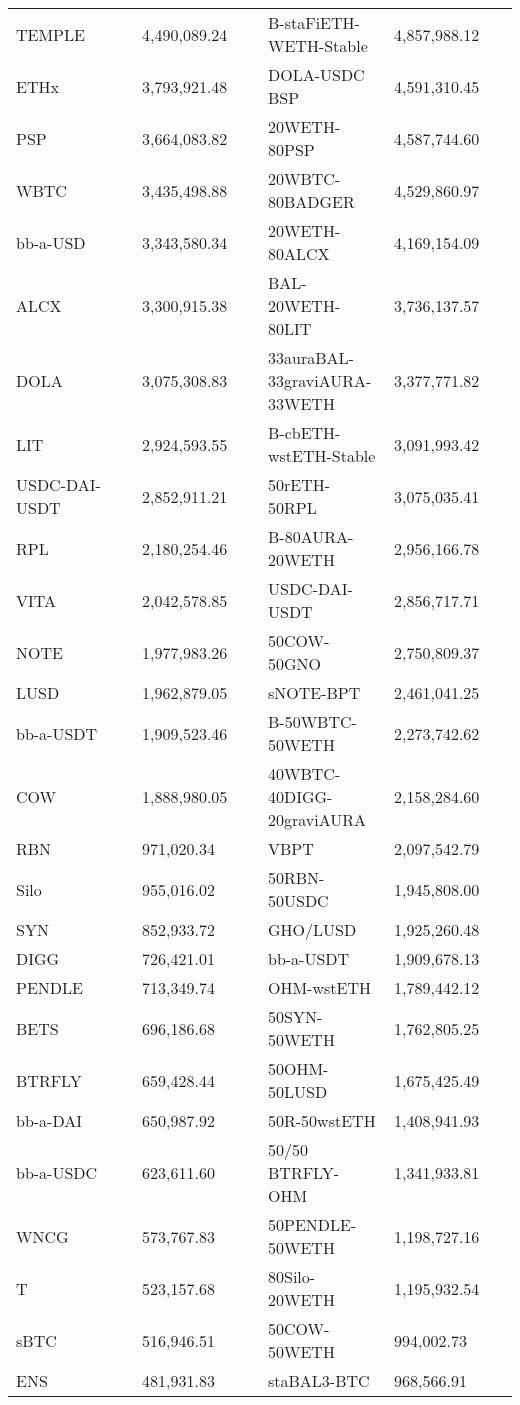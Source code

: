 \begin{longtable}{@{}p{0.25\linewidth}p{0.25\linewidth}p{0.25\linewidth}p{0.25\linewidth}@{}}
TEMPLE & 4,490,089.24 & B-staFiETH-WETH-Stable & 4,857,988.12 \\
ETHx & 3,793,921.48 & DOLA-USDC BSP & 4,591,310.45 \\
PSP & 3,664,083.82 & 20WETH-80PSP & 4,587,744.60 \\
WBTC & 3,435,498.88 & 20WBTC-80BADGER & 4,529,860.97 \\
bb-a-USD & 3,343,580.34 & 20WETH-80ALCX & 4,169,154.09 \\
ALCX & 3,300,915.38 & BAL-20WETH-80LIT & 3,736,137.57 \\
DOLA & 3,075,308.83 & 33auraBAL-33graviAURA-33WETH & 3,377,771.82 \\
LIT & 2,924,593.55 & B-cbETH-wstETH-Stable & 3,091,993.42 \\
USDC-DAI-USDT & 2,852,911.21 & 50rETH-50RPL & 3,075,035.41 \\
RPL & 2,180,254.46 & B-80AURA-20WETH & 2,956,166.78 \\
VITA & 2,042,578.85 & USDC-DAI-USDT & 2,856,717.71 \\
NOTE & 1,977,983.26 & 50COW-50GNO & 2,750,809.37 \\
LUSD & 1,962,879.05 & sNOTE-BPT & 2,461,041.25 \\
bb-a-USDT & 1,909,523.46 & B-50WBTC-50WETH & 2,273,742.62 \\
COW & 1,888,980.05 & 40WBTC-40DIGG-20graviAURA & 2,158,284.60 \\
RBN & 971,020.34 & VBPT & 2,097,542.79 \\
Silo & 955,016.02 & 50RBN-50USDC & 1,945,808.00 \\
SYN & 852,933.72 & GHO/LUSD & 1,925,260.48 \\
DIGG & 726,421.01 & bb-a-USDT & 1,909,678.13 \\
PENDLE & 713,349.74 & OHM-wstETH & 1,789,442.12 \\
BETS & 696,186.68 & 50SYN-50WETH & 1,762,805.25 \\
BTRFLY & 659,428.44 & 50OHM-50LUSD & 1,675,425.49 \\
bb-a-DAI & 650,987.92 & 50R-50wstETH & 1,408,941.93 \\
bb-a-USDC & 623,611.60 & 50/50 BTRFLY-OHM & 1,341,933.81 \\
WNCG & 573,767.83 & 50PENDLE-50WETH & 1,198,727.16 \\
T & 523,157.68 & 80Silo-20WETH & 1,195,932.54 \\
sBTC & 516,946.51 & 50COW-50WETH & 994,002.73 \\
ENS & 481,931.83 & staBAL3-BTC & 968,566.91 \\

\end{longtable}
